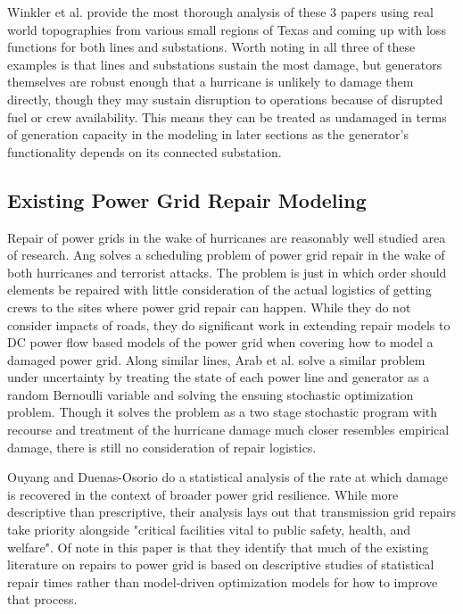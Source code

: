 \documentclass{article}
\begin{document}
		 Winkler et al. \cite{WinklerEA2010} provide the most thorough analysis of these 3 papers using real world topographies from various small regions of Texas and coming up with loss functions for both lines and substations. Worth noting in all three of these examples is that lines and substations sustain the most damage, but generators themselves are robust enough that a hurricane is unlikely to damage them directly, though they may sustain disruption to operations because of disrupted fuel or crew availability. This means they can be treated as undamaged in terms of generation capacity in the modeling in later sections as the generator's functionality depends on its connected substation. 
	\subsection{Existing Power Grid Repair Modeling}
	Repair of power grids in the wake of hurricanes are reasonably well studied area of research. Ang \cite{NPSMasters} solves a scheduling problem of power grid repair in the wake of both hurricanes and terrorist attacks. The problem is just in which order should elements be repaired with little consideration of the actual logistics of getting crews to the sites where power grid repair can happen. While they do not consider impacts of roads, they do significant work in extending repair models to DC power flow based models of the power grid when covering how to model a damaged power grid. Along similar lines, Arab et al. \cite{ArabEA2015} solve a similar problem under uncertainty by treating the state of each power line and generator as a random Bernoulli variable and solving the ensuing stochastic optimization problem. Though it solves the problem as a two stage stochastic program with recourse and treatment of the hurricane damage much closer resembles empirical damage, there is still no consideration of repair logistics. 
		
	Ouyang and Duenas-Osorio \cite{OuyangEA2014} do a statistical analysis of the rate at which damage is recovered in the context of broader power grid resilience. While more descriptive than prescriptive, their analysis lays out that transmission grid repairs take priority alongside "critical facilities vital to public safety, health, and welfare". Of note in this paper is that they identify that much of the existing literature on repairs to power grid is based on descriptive studies of statistical repair times rather than model-driven optimization models for how to improve that process.
		
\end{document}
